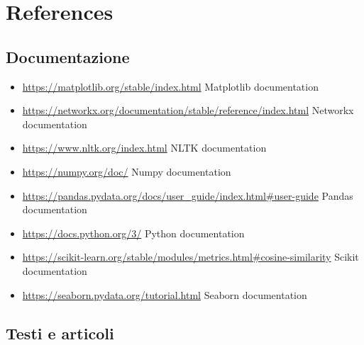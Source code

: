 \documentclass[11pt]{article}
\begin{document}
\section*{References}
\subsection*{Documentazione}
\label{ssec:layout}


\begin{itemize}
    \item \url{https://matplotlib.org/stable/index.html} Matplotlib documentation
    \item \url{https://networkx.org/documentation/stable/reference/index.html} Networkx documentation
    \item \url{https://www.nltk.org/index.html} NLTK documentation
    \item \url{https://numpy.org/doc/} Numpy documentation
    \item \url{https://pandas.pydata.org/docs/user_guide/index.html#user-guide} Pandas documentation
    \item \url{https://docs.python.org/3/} Python documentation
    \item \url{https://scikit-learn.org/stable/modules/metrics.html#cosine-similarity} Scikit documentation
    \item \url{https://seaborn.pydata.org/tutorial.html} Seaborn documentation
\end{itemize}



\subsection*{Testi e articoli}
\label{ssec:layout}
\end{document}

